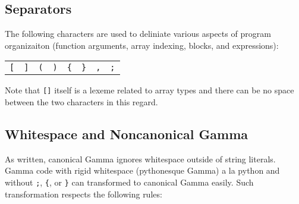 \subsection{Separators}
The following characters are used to deliniate various aspects of program organizaiton (function arguments, array indexing, blocks, and expressions):
\begin{center}
\begin{tabular}{cccccccc}
\verb![! & \verb|]| & \verb!(! & \verb!)! & \verb!{! & \verb!}! & \verb!,! & \verb!;!\\
\end{tabular}
\end{center}
Note that \verb![]! itself is a lexeme related to array types and there can be no space between the two characters in this regard.

\subsection{Whitespace and Noncanonical Gamma}
As written, canonical Gamma ignores whitespace outside of string literals. Gamma code with rigid whitespace (pythonesque Gamma) a la python and without \verb!;!, \verb!{!, or \verb!}! can transformed to canonical Gamma easily. Such transformation respects the following rules:
